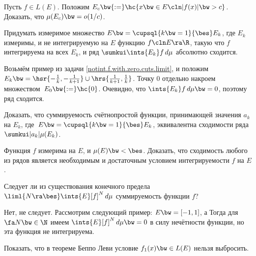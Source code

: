 \documentclass[a4paper,draft]{article}
\begin{document}
\begin{problem}
  Пусть $f \in L(E)$. Положим
  $E_c \bw{:=} \hc{x \bw\in E\cln |f(x)| \bw> c}$.
  Доказать, что $\mu(E_c) \bw= o(1/c)$.
\end{problem}

\begin{problem}
  Придумать измеримое множество $E \bw= \cupsql{k\bw=1}{\bes} E_k$, где $E_k$ измеримы, и
  не интегрируемую на $E$ функцию $f\cln E \ra \R$, такую что $f$ интегрируема на всех $E_k$, и ряд
  $\sumkui \ints{E_k} f\,d\mu$ абсолютно сходится.
\end{problem}
\begin{solution}
  Возьмём пример из задачи \ref{notint.f.with.zero.cuts.limit}, и положим
  $E_k \bw= \hsr{-\frac1k, -\frac1{k+1}} \cup \hrs{\frac1{k+1}, \frac1k}$. Точку $0$ отдельно
  накроем множеством~$E_0 \bw{:=} \hc{0}$. Очевидно, что $\ints{E_k} f\,d\mu \bw= 0$, поэтому
  ряд сходится.
\end{solution}

\begin{problem}
  Доказать, что суммируемость счётно\д простой функции, принимающей значения $a_k$ на $E_k$,
  где~$E \bw= \cupsql{k\bw=1}{\bes} E_k$, эквивалентна сходимости ряда $\sumkui |a_k| \mu(E_k)$.
\end{problem}

\begin{problem}
  Функция $f$ измерима на $E$, и $\mu(E) \bw< \bes$. Доказать, что сходимость любого из рядов
  является необходимым и достаточным условием интегрируемости $f$ на $E$.
\end{problem}

\begin{problem}\label{notint.f.with.zero.cuts.limit}
  Следует ли из существования конечного предела $\liml{N \ra \bes} \ints{E}[f]^N\,d\mu$
  суммируемость функции $f$?
\end{problem}
\begin{solution}
  Нет, не следует. Рассмотрим следующий пример: $E \bw= [-1,1]$, а
  Тогда для $\fa N \bw\in \N$ имеем $\ints{E} [f]^N\, d\mu \bw= 0$ в силу нечётности функции,
  но эта функция не интегрируема.
\end{solution}

\begin{problem}
  Показать, что в теореме Беппо Леви условие $f_1(x) \bw\in L(E)$ нельзя выбросить.
\end{problem}
\end{document}

